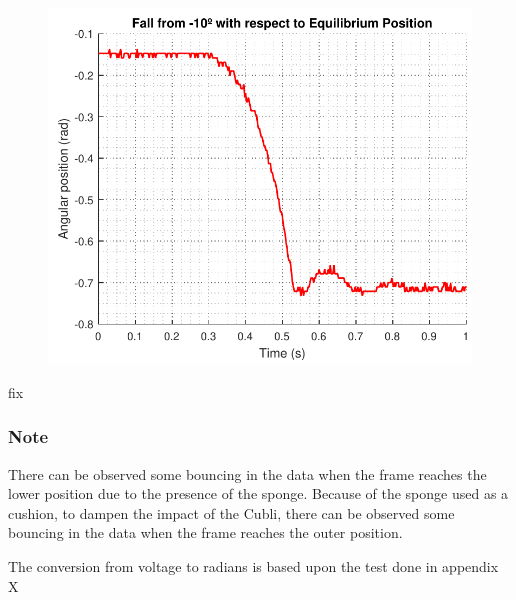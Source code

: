 \begin{minipage}{\linewidth}
\begin{minipage}{0.45\linewidth}
\begin{figure}[H]
			\includegraphics[scale=.53]{figures/tenDegFallRad}
			\centering
			\vspace{-.4cm}
			\captionsetup{justification=centering}
			\label{tenDegFallRad}
		\end{figure}\vspace{-5mm}
	\end{minipage}
\end{minipage} 
fix


%
%
%

\subsubsection{Note}

There can be observed some bouncing in the data when the frame reaches the lower position due to the presence of the sponge.
Because of the sponge used as a cushion, to dampen the impact of the Cubli, there can be observed some bouncing in the data when the frame reaches the outer position.

The conversion from voltage to radians is based upon the test done in appendix X



